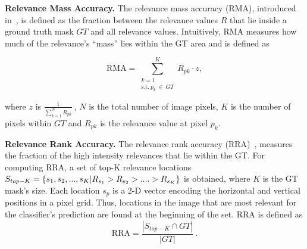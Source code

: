 \documentclass[runningheads]{llncs}
\begin{document}
\textbf{Relevance Mass Accuracy.} 
The relevance mass accuracy (RMA), introduced in~\cite{Osman.2020}, is defined as the fraction between the relevance values $R$ that lie inside a ground truth mask $GT$ and all relevance values. Intuitively, RMA measures how much of the relevance's \enquote{mass} lies within the GT area and is defined as 



\vspace{-2mm}
\begin{equation} \label{eq:rma}
    \mathrm{RMA} = {\displaystyle  \sum^{K}_{
        \substack{k=1 \\
        \mathrm{s.t.} \  p_k\ \in \ GT
    }} {R_{pk}}} \cdot z,
\end{equation}

where $z$ is $ \frac{1}{\sum^{N}_{k=1}{R_{pk}}}~$, $N$ is the total number of image pixels, $K$ is the number of pixels within $GT$ and $R_{pk}$ is the relevance value at pixel $p_k$.

\textbf{Relevance Rank Accuracy.}
The relevance rank accuracy (RRA)~\cite{Osman.2020}, measures the fraction of the high intensity relevances that lie within the GT. For computing RRA, a set of top-K relevance locations $S_{top-K} = \{ s_1, s_2, ..., s_K | \newline R_{s_1} > R_{s_2} > .... > R_{s_K} \}$ is obtained, where $K$ is the GT mask's size. Each location $s_p$ is a 2-D vector encoding the horizontal and vertical positions in a pixel grid. Thus, locations in the image that are most relevant for the classifier's prediction are found at the beginning of the set. RRA is defined as
\begin{equation} \label{eq:rra}
    \mathrm{RRA} = \frac{|S_{top-K} \cap GT|}{|GT|}~.
\end{equation}
\end{document}
